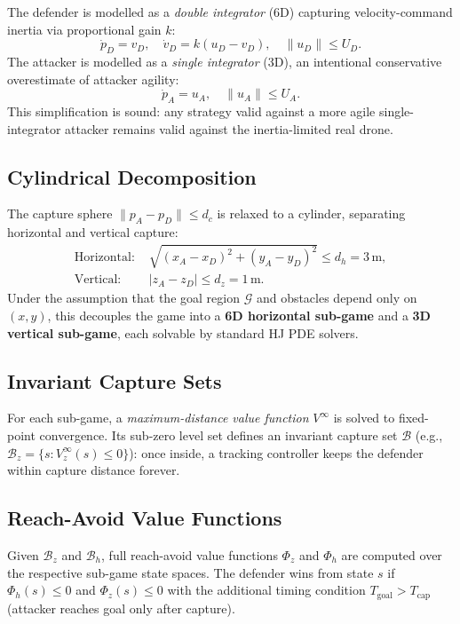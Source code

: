 \documentclass[conference]{IEEEtran}
\begin{document}
The defender is modelled as a \emph{double integrator} (6D) capturing velocity-command inertia via proportional gain $k$:
\begin{equation}
  \dot{p}_D = v_D, \quad \dot{v}_D = k(u_D - v_D), \quad \|u_D\| \leq U_D.
  \label{eq:defender}
\end{equation}
The attacker is modelled as a \emph{single integrator} (3D), an intentional conservative overestimate of attacker agility:
\begin{equation}
  \dot{p}_A = u_A, \quad \|u_A\| \leq U_A.
  \label{eq:attacker}
\end{equation}
This simplification is sound: any strategy valid against a more agile single-integrator attacker remains valid against the inertia-limited real drone.

\subsection{Cylindrical Decomposition}

The capture sphere $\|p_A - p_D\| \leq d_c$ is relaxed to a cylinder, separating horizontal and vertical capture:
\begin{align}
  \text{Horizontal: } & \sqrt{(x_A{-}x_D)^2 + (y_A{-}y_D)^2} \leq d_h = 3\,\text{m},\\
  \text{Vertical: }   & |z_A - z_D| \leq d_z = 1\,\text{m}.
\end{align}
Under the assumption that the goal region $\mathcal{G}$ and obstacles depend only on $(x,y)$, this decouples the game into a \textbf{6D horizontal sub-game} and a \textbf{3D vertical sub-game}, each solvable by standard HJ PDE solvers.

\subsection{Invariant Capture Sets}

For each sub-game, a \emph{maximum-distance value function} $V^\infty$ is solved to fixed-point convergence. Its sub-zero level set defines an invariant capture set $\mathcal{B}$ (e.g., $\mathcal{B}_z = \{s : V_z^\infty(s) \leq 0\}$): once inside, a tracking controller keeps the defender within capture distance forever.

\subsection{Reach-Avoid Value Functions}

Given $\mathcal{B}_z$ and $\mathcal{B}_h$, full reach-avoid value functions $\Phi_z$ and $\Phi_h$ are computed over the respective sub-game state spaces. The defender wins from state $s$ if $\Phi_h(s) \leq 0$ and $\Phi_z(s) \leq 0$ with the additional timing condition $T_\text{goal} > T_\text{cap}$ (attacker reaches goal only after capture).
\end{document}
